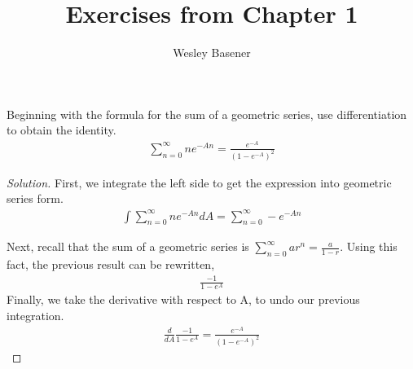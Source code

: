 \documentclass[10pt]{article}
\newenvironment{problem}[2][Problem]{\begin{trivlist}
		\item[\hskip \labelsep {\bfseries #1}\hskip \labelsep {\bfseries #2.}]}{\end{trivlist}}
\begin{document}
	
	\title{Exercises from Chapter 1}
	\author{Wesley Basener}
	\maketitle
	
	\begin{problem}{1.1}
		Beginning with the formula for the sum of a geometric series, use
		differentiation to obtain the identity.\\
		\begin{align*}
			\sum_{n=0}^{\infty}ne^{-An} = \frac{e^{-A}}{(1-e^{-A})^{2}} 
		\end{align*}
	\end{problem}
	
	
	
	\begin{proof}[Solution]
		First, we integrate the left side to get the expression into geometric series form. 
		\begin{align*}
			\int \sum_{n=0}^{\infty} ne^{-An} dA =  \sum_{n=0}^{\infty} -e^{-An}
		\end{align*}
		
		Next, recall that the sum of a geometric series is $\sum_{n=0}^{\infty} ar^{n} = \frac{a}{1-r}$. Using this fact, the previous result can be rewritten,
		\begin{align*}
			\frac{-1}{1-e^{A}}
		\end{align*}
		Finally, we take the derivative with respect to A, to undo our previous integration.
		\begin{align*}
			\frac{d}{dA} \frac{-1}{1-e^{A}} =\frac{e^{-A}}{(1-e^{-A})^{2}}
			\end{align*}
	\end{proof}
	
\end{document}

